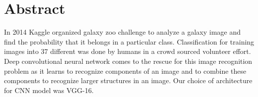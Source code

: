 \section{Abstract}

In 2014 Kaggle organized galaxy zoo challenge to analyze a galaxy image and find the probability that it belongs in a particular class. Classification for training images into 37 different was done by humans in a crowd sourced volunteer effort. Deep convolutional neural network comes to the rescue for this image recognition problem as it learns to recognize components of an image and to combine these components to recognize larger structures in an image. Our choice of architecture for CNN model was VGG-16.

